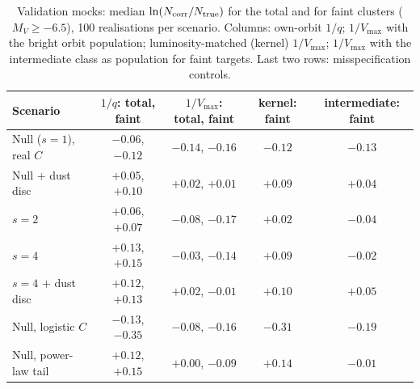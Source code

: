 \documentclass[11pt,a4paper]{article}
\newcommand{\MV}{M_V}
\begin{document}
\begin{table}[h]
\centering
\caption{Validation mocks: median $\ln(N_{\rm corr}/N_{\rm true})$ for the total and for faint clusters
($\MV\ge-6.5$), 100 realisations per scenario. Columns: own-orbit $1/q$; $1/V_{\max}$ with the bright
orbit population; luminosity-matched (kernel) $1/V_{\max}$; $1/V_{\max}$ with the intermediate class as
population for faint targets. Last two rows: misspecification controls.}
\label{tab:faint_mock}
\small\setlength{\tabcolsep}{4pt}
\begin{tabular}{lcccc}
\toprule
Scenario & $1/q$: total, faint & $1/V_{\max}$: total, faint & kernel: faint & intermediate: faint \\
\midrule
Null ($s=1$), real $C$ & $-0.06$, $-0.12$ & $-0.14$, $-0.16$ & $-0.12$ & $-0.13$ \\
Null + dust disc & $+0.05$, $+0.10$ & $+0.02$, $+0.01$ & $+0.09$ & $+0.04$ \\
$s=2$ & $+0.06$, $+0.07$ & $-0.08$, $-0.17$ & $+0.02$ & $-0.04$ \\
$s=4$ & $+0.13$, $+0.15$ & $-0.03$, $-0.14$ & $+0.09$ & $-0.02$ \\
$s=4$ + dust disc & $+0.12$, $+0.13$ & $+0.02$, $-0.01$ & $+0.10$ & $+0.05$ \\
\midrule
Null, logistic $C$ & $-0.13$, $-0.35$ & $-0.08$, $-0.16$ & $-0.31$ & $-0.19$ \\
Null, power-law tail & $+0.12$, $+0.15$ & $+0.00$, $-0.09$ & $+0.14$ & $-0.01$ \\
\bottomrule
\end{tabular}
\end{table}
\end{document}
